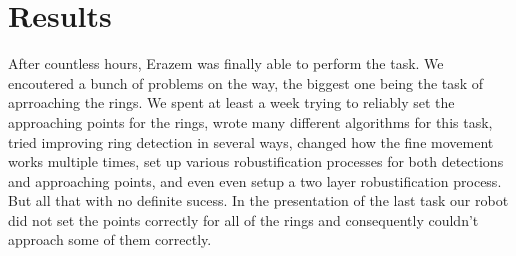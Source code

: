 \documentclass[12pt,a4paper]{article}
\begin{document}
	\section{Results}

	After countless hours, Erazem was finally able to perform the task. We encoutered a bunch of problems on the way, the biggest one being the task of aprroaching the rings. We spent at least a week trying to reliably set the approaching points for the rings, wrote many different algorithms for this task, tried improving ring detection in several ways, changed how the fine movement works multiple times, set up various robustification processes for both detections and approaching points, and even even setup a two layer robustification process. But all that with no definite sucess. In the presentation of the last task our robot did not set the points correctly for all of the rings and consequently couldn't approach some of them correctly. \\
\end{document}
